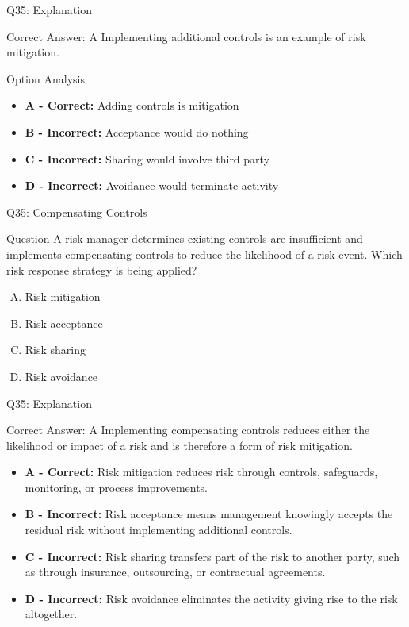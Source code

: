 \documentclass{beamer}
\begin{document}
	\begin{frame}{Q35: Explanation}
		\begin{block}{Correct Answer: A}
			Implementing additional controls is an example of risk mitigation.
		\end{block}
		\begin{block}{Option Analysis}
			\begin{itemize}
				\item \textbf{A - Correct:} Adding controls is mitigation
				\item \textbf{B - Incorrect:} Acceptance would do nothing
				\item \textbf{C - Incorrect:} Sharing would involve third party
				\item \textbf{D - Incorrect:} Avoidance would terminate activity
			\end{itemize}
		\end{block}
	\end{frame}
	
	
	\begin{frame}{Q35: Compensating Controls} \begin{block}{Question} A risk manager determines existing controls are insufficient and implements compensating controls to reduce the likelihood of a risk event. Which risk response strategy is being applied? \end{block} \begin{enumerate}[(A)] \item Risk mitigation \item Risk acceptance \item Risk sharing \item Risk avoidance \end{enumerate} \end{frame} \begin{frame}{Q35: Explanation} \begin{block}{Correct Answer: A} Implementing compensating controls reduces either the likelihood or impact of a risk and is therefore a form of risk mitigation. \end{block} \begin{itemize} \item \textbf{A - Correct:} Risk mitigation reduces risk through controls, safeguards, monitoring, or process improvements. \item \textbf{B - Incorrect:} Risk acceptance means management knowingly accepts the residual risk without implementing additional controls. \item \textbf{C - Incorrect:} Risk sharing transfers part of the risk to another party, such as through insurance, outsourcing, or contractual agreements. \item \textbf{D - Incorrect:} Risk avoidance eliminates the activity giving rise to the risk altogether. \end{itemize} \end{frame}
	
\end{document}

